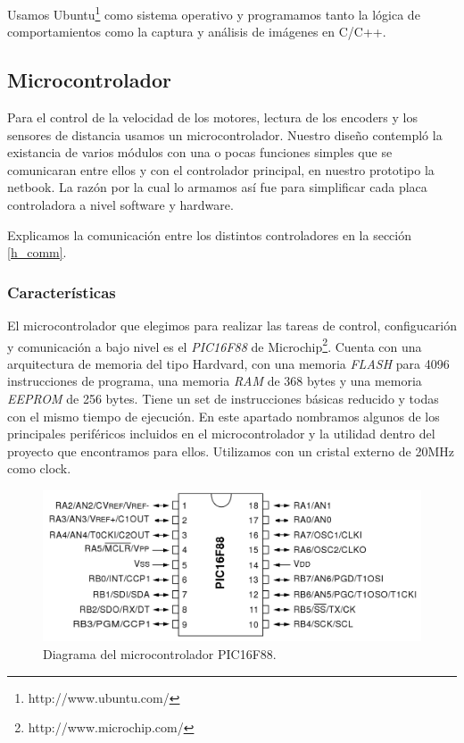 Usamos Ubuntu\footnote{http://www.ubuntu.com/} como sistema operativo y programamos tanto la l\'ogica de comportamientos
como la captura y an\'alisis de im\'agenes en C/C++.

\subsection{Microcontrolador}
\label{h_controlador_micro}

Para el control de la velocidad de los motores, lectura de los encoders y los sensores de distancia usamos un
microcontrolador.
Nuestro dise\~no contempl\'o la existancia de varios m\'odulos con una o pocas funciones simples que se comunicaran
entre ellos y con el controlador principal, en nuestro prototipo la netbook.
La raz\'on por la cual lo armamos as\'i fue para simplificar cada placa controladora a nivel software y hardware.

Explicamos la comunicaci\'on entre los distintos controladores en la secci\'on \ref{h_comm}.

\subsubsection{Caracter\'isticas}
\label{h_controlador_micro_caracteristicas}

El microcontrolador que elegimos para realizar las tareas de control, configucari\'on y comunicaci\'on a bajo nivel
es el \emph{PIC16F88} de Microchip\footnote{http://www.microchip.com/}.
Cuenta con una arquitectura de memoria del tipo Hardvard, con una memoria \emph{FLASH} para 4096 instrucciones de
programa, una memoria \emph{RAM} de 368 bytes y una memoria \emph{EEPROM} de 256 bytes.
Tiene un set de instrucciones b\'asicas reducido y todas con el mismo tiempo de ejecuci\'on.
En este apartado nombramos algunos de los principales perif\'ericos incluidos en el microcontrolador y la utilidad
dentro del proyecto que encontramos para ellos.
Utilizamos con un cristal externo de 20MHz como clock.

\begin{figure}[ht]
	\centering
	\includegraphics[scale=0.20]{pic16f88.png}
	\caption{Diagrama del microcontrolador PIC16F88.}
	\label{hF_pic16f88_diagrama}
\end{figure}

